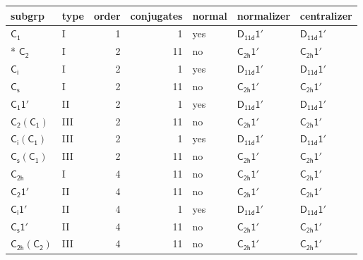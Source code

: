 \documentclass[10pt,a4paper]{article}
\numberwithin{equation}{section}
\newcommand{\grp}[1]{\mathsf{#1}}
\begin{document}
{\small\begin{longtable}{@{}llrrlll@{}}\toprule
subgrp & type & order & conjugates & normal & normalizer & centralizer\\\midrule\endhead
\bottomrule\endfoot\endlastfoot
\href{../../../rotation/data/pdf/C1.pdf}{$\grp{C_{1}}$} & I & 1 & 1 & yes & \href{D11d-1p.pdf}{$\grp{D_{11d}1'}$} & \href{D11d-1p.pdf}{$\grp{D_{11d}1'}$}\\*
\href{../../../rotation/data/pdf/C2.pdf}{$\grp{C_{2}}$} & I & 2 & 11 & no & \href{C2h-1p.pdf}{$\grp{C_{2h}1'}$} & \href{C2h-1p.pdf}{$\grp{C_{2h}1'}$}\\
\href{../../../rotation/data/pdf/S2.pdf}{$\grp{C_{i}}$} & I & 2 & 1 & yes & \href{D11d-1p.pdf}{$\grp{D_{11d}1'}$} & \href{D11d-1p.pdf}{$\grp{D_{11d}1'}$}\\
\href{../../../rotation/data/pdf/C1v.pdf}{$\grp{C_{s}}$} & I & 2 & 11 & no & \href{C2h-1p.pdf}{$\grp{C_{2h}1'}$} & \href{C2h-1p.pdf}{$\grp{C_{2h}1'}$}\\
\href{C1-1p.pdf}{$\grp{C_{1}1'}$} & II & 2 & 1 & yes & \href{D11d-1p.pdf}{$\grp{D_{11d}1'}$} & \href{D11d-1p.pdf}{$\grp{D_{11d}1'}$}\\
\href{C2-C1.pdf}{$\grp{C_{2}}(\grp{C_{1}})$} & III & 2 & 11 & no & \href{C2h-1p.pdf}{$\grp{C_{2h}1'}$} & \href{C2h-1p.pdf}{$\grp{C_{2h}1'}$}\\
\href{S2-C1.pdf}{$\grp{C_{i}}(\grp{C_{1}})$} & III & 2 & 1 & yes & \href{D11d-1p.pdf}{$\grp{D_{11d}1'}$} & \href{D11d-1p.pdf}{$\grp{D_{11d}1'}$}\\
\href{C1v-C1.pdf}{$\grp{C_{s}}(\grp{C_{1}})$} & III & 2 & 11 & no & \href{C2h-1p.pdf}{$\grp{C_{2h}1'}$} & \href{C2h-1p.pdf}{$\grp{C_{2h}1'}$}\\
\href{../../../rotation/data/pdf/C2h.pdf}{$\grp{C_{2h}}$} & I & 4 & 11 & no & \href{C2h-1p.pdf}{$\grp{C_{2h}1'}$} & \href{C2h-1p.pdf}{$\grp{C_{2h}1'}$}\\
\href{C2-1p.pdf}{$\grp{C_{2}1'}$} & II & 4 & 11 & no & \href{C2h-1p.pdf}{$\grp{C_{2h}1'}$} & \href{C2h-1p.pdf}{$\grp{C_{2h}1'}$}\\
\href{S2-1p.pdf}{$\grp{C_{i}1'}$} & II & 4 & 1 & yes & \href{D11d-1p.pdf}{$\grp{D_{11d}1'}$} & \href{D11d-1p.pdf}{$\grp{D_{11d}1'}$}\\
\href{C1v-1p.pdf}{$\grp{C_{s}1'}$} & II & 4 & 11 & no & \href{C2h-1p.pdf}{$\grp{C_{2h}1'}$} & \href{C2h-1p.pdf}{$\grp{C_{2h}1'}$}\\
\href{C2h-C2.pdf}{$\grp{C_{2h}}(\grp{C_{2}})$} & III & 4 & 11 & no & \href{C2h-1p.pdf}{$\grp{C_{2h}1'}$} & \href{C2h-1p.pdf}{$\grp{C_{2h}1'}$}\\

\end{longtable}}
\end{document}
